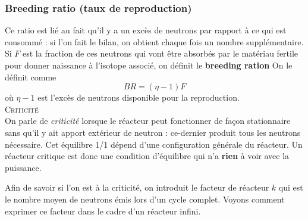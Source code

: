 \subsubsection{Breeding ratio (taux de reproduction)}
Ce ratio est lié au fait qu'il y a un excès de neutrons par rapport à ce qui est consommé : si l'on 
fait le bilan, on obtient chaque fois un nombre supplémentaire. Si $F$ est la fraction de ces 
neutrons qui vont être absorbés par le matériau fertile pour donner naissance à l'isotope associé, 
on définit le \textbf{breeding ration}
On le définit comme
\begin{equation}
BR = (\eta-1)F
\end{equation}
où $\eta-1$ est l'excès de neutrons disponible pour la reproduction.\\

\textsc{Criticité}\\
On parle de \textit{criticité} lorsque le réacteur peut fonctionner de façon stationnaire sans 
qu'il y ait apport extérieur de neutron : ce-dernier produit tous les neutrons nécessaire. Cet 
équilibre 1/1 dépend d'une configuration générale du réacteur. Un réacteur critique est donc 
une condition d'équilibre qui n'a \textbf{rien} à voir avec la puissance.

\newpage
Afin de savoir si l'on est à la criticité, on introduit le facteur de réacteur $k$ qui est 
le nombre moyen de neutrons émis lors d'un cycle complet. Voyons comment exprimer ce facteur dans 
le cadre d'un réacteur infini. \\


